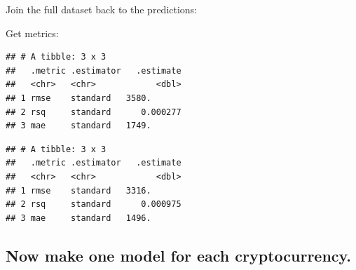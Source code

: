 \documentclass[
]{book}
\newenvironment{Shaded}{\begin{snugshade}}{\end{snugshade}}
\newcommand{\DataTypeTok}[1]{\textcolor[rgb]{0.13,0.29,0.53}{#1}}
\newcommand{\KeywordTok}[1]{\textcolor[rgb]{0.13,0.29,0.53}{\textbf{#1}}}
\newcommand{\NormalTok}[1]{#1}
\newcommand{\OperatorTok}[1]{\textcolor[rgb]{0.81,0.36,0.00}{\textbf{#1}}}
\newcommand{\StringTok}[1]{\textcolor[rgb]{0.31,0.60,0.02}{#1}}
\begin{document}
Join the full dataset back to the predictions:

\begin{Shaded}
\end{Shaded}

Get metrics:

\begin{Shaded}
\end{Shaded}

\begin{verbatim}
## # A tibble: 3 x 3
##   .metric .estimator   .estimate
##   <chr>   <chr>            <dbl>
## 1 rmse    standard   3580.      
## 2 rsq     standard      0.000277
## 3 mae     standard   1749.
\end{verbatim}

\begin{Shaded}
\end{Shaded}

\begin{verbatim}
## # A tibble: 3 x 3
##   .metric .estimator   .estimate
##   <chr>   <chr>            <dbl>
## 1 rmse    standard   3316.      
## 2 rsq     standard      0.000975
## 3 mae     standard   1496.
\end{verbatim}

\hypertarget{now-make-one-model-for-each-cryptocurrency.}{%
\subsection{Now make one model for each cryptocurrency.}\label{now-make-one-model-for-each-cryptocurrency.}}
\end{document}
